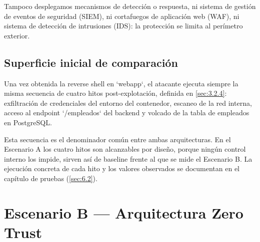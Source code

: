         Tampoco desplegamos mecanismos de detección o respuesta, ni sistema de gestión de eventos de seguridad (SIEM), ni cortafuegos de aplicación web (WAF), ni sistema de detección de intrusiones (IDS): la protección se limita al perímetro exterior.
        
        \subsection{Superficie inicial de comparación}
        Una vez obtenida la reverse shell en `webapp`, el atacante ejecuta siempre la misma secuencia de cuatro hitos post-explotación, definida en \cref{sec:3.2.4}: exfiltración de credenciales del entorno del contenedor, escaneo de la red interna, acceso al endpoint `/empleados` del backend y volcado de la tabla de empleados en PostgreSQL.
        
        Esta secuencia es el denominador común entre ambas arquitecturas. En el Escenario A los cuatro hitos son alcanzables por diseño, porque ningún control interno los impide, sirven así de baseline frente al que se mide el Escenario B. La ejecución concreta de cada hito y los valores observados se documentan en el capítulo de pruebas (\cref{sec:6.2}).

    \section{Escenario B — Arquitectura Zero Trust}
